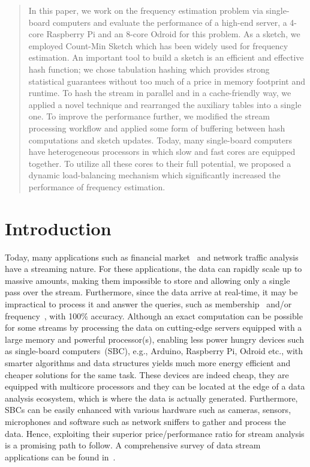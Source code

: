 \documentclass[10pt, review=true,sigconf]{acmart}
\begin{document}
\begin{abstract}
In this paper, we work on the frequency estimation problem via single-board computers and evaluate the performance of a high-end server, a 4-core Raspberry Pi and an 8-core Odroid for this problem. As a sketch, we employed Count-Min Sketch which has been widely used for frequency estimation. An important tool to build a sketch is an efficient and effective hash function;  we chose tabulation hashing which provides strong statistical guarantees without too much of a price in memory footprint and runtime. To hash the stream in parallel and in a cache-friendly way, we applied a novel technique and rearranged the auxiliary tables into a single one. To improve the performance further, we modified the stream processing workflow and applied some form of buffering between hash computations and sketch updates. Today, many single-board computers have heterogeneous processors in which slow and fast cores are equipped together. To utilize all these cores to their full potential, we proposed a dynamic load-balancing mechanism which significantly increased the performance of  frequency estimation. 

\end{abstract}

\maketitle

\section{Introduction}
    
Today, many applications such as financial market~\cite{chandramouli2010} and network traffic analysis~\cite{fan1998,duffield2001} have a streaming nature. For these applications, the data can rapidly scale up to massive amounts, making them impossible to store and allowing only a single pass over the stream.  Furthermore, since the data arrive at real-time, it may be impractical to process it and answer the queries, such as membership~\cite{brodnik1999} and/or frequency~\cite{charikar2002}, with 100$\%$ accuracy. Although an exact computation can be possible for some streams by processing the data on cutting-edge servers equipped with a large memory and powerful processor(s), enabling less power hungry devices such as single-board computers~(SBC), e.g., Arduino, Raspberry Pi, Odroid etc., with smarter algorithms and data structures yields much more energy efficient and cheaper solutions for the same task. These devices are indeed cheap, they are equipped with multicore processors and they can be located at the edge of a data analysis ecosystem, which is where the data is actually generated. Furthermore, SBCs can be easily enhanced with various hardware such as cameras, sensors, microphones and software such as network sniffers to gather and process the data. Hence, exploiting their superior price/performance ratio for stream analysis is a promising path to follow. A comprehensive survey of data stream applications can be found in~\cite{muthukrishnan2005}. 
      
\end{document}
